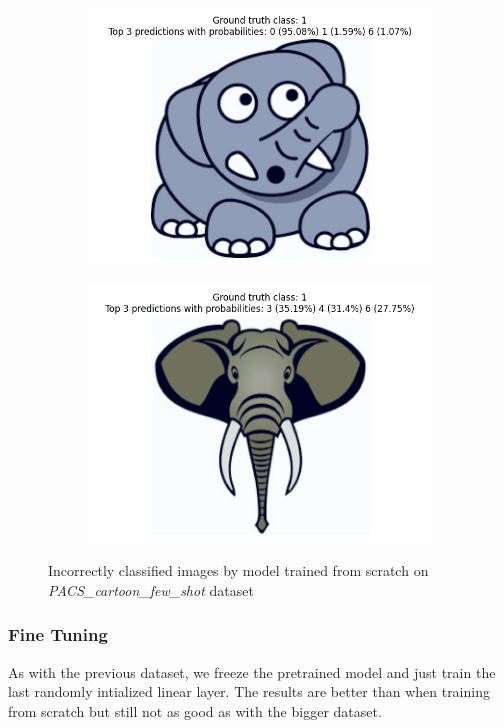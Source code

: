 \documentclass[a4paper,11pt]{article}
\begin{document}
\begin{figure}[ht]
\begin{subfigure}[b]{0.45\textwidth}
        \includegraphics[width=\textwidth]{../out/few_shot_full_model/error_3.png}
    \end{subfigure}
    \hfill
    \begin{subfigure}[b]{0.45\textwidth}
        \includegraphics[width=\textwidth]{../out/few_shot_full_model/error_4.png}
    \end{subfigure}
    \caption{Incorrectly classified images by model trained from scratch on \textit{PACS\_cartoon\_few\_shot} dataset}
    \label{fig:few_shot_full_model_incorrect}
\end{figure}

\subsubsection{Fine Tuning}
As with the previous dataset, we freeze the pretrained model and just train the last randomly intialized linear layer.
The results are better than when training from scratch but still not as good as with the bigger dataset.
\end{document}
